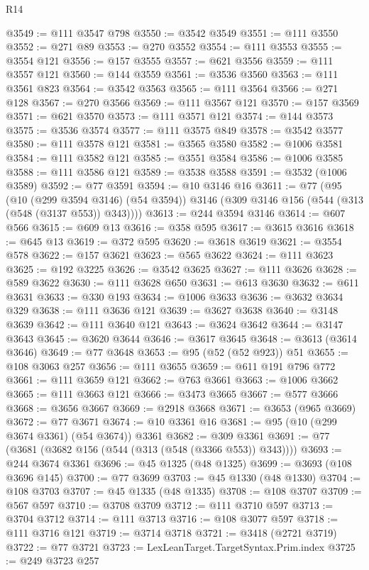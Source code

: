 \begin{lexlean}{R14}
\begin{coremodule}
@3549 := @111 @3547 @798
@3550 := @3542 @3549
@3551 := @111 @3550
@3552 := @271 @89
@3553 := @270 @3552
@3554 := @111 @3553
@3555 := @3554 @121
@3556 := @157 @3555
@3557 := @621 @3556
@3559 := @111 @3557 @121
@3560 := @144 @3559
@3561 := @3536 @3560
@3563 := @111 @3561 @823
@3564 := @3542 @3563
@3565 := @111 @3564
@3566 := @271 @128
@3567 := @270 @3566
@3569 := @111 @3567 @121
@3570 := @157 @3569
@3571 := @621 @3570
@3573 := @111 @3571 @121
@3574 := @144 @3573
@3575 := @3536 @3574
@3577 := @111 @3575 @849
@3578 := @3542 @3577
@3580 := @111 @3578 @121
@3581 := @3565 @3580
@3582 := @1006 @3581
@3584 := @111 @3582 @121
@3585 := @3551 @3584
@3586 := @1006 @3585
@3588 := @111 @3586 @121
@3589 := @3538 @3588
@3591 := @3532 (@1006 @3589)
@3592 := @77 @3591
@3594 := @10 @3146 @16
@3611 := @77
    (@95
      (@10 (@299 @3594 @3146) (@54 @3594))
      @3146
      (@309 @3146 @156 (@544 (@313 (@548 (@3137 @553)) @343))))
@3613 := @244 @3594 @3146
@3614 := @607 @566
@3615 := @609 @13
@3616 := @358 @595
@3617 := @3615 @3616
@3618 := @645 @13
@3619 := @372 @595
@3620 := @3618 @3619
@3621 := @3554 @578
@3622 := @157 @3621
@3623 := @565 @3622
@3624 := @111 @3623
@3625 := @192 @3225
@3626 := @3542 @3625
@3627 := @111 @3626
@3628 := @589 @3622
@3630 := @111 @3628 @650
@3631 := @613 @3630
@3632 := @611 @3631
@3633 := @330 @193
@3634 := @1006 @3633
@3636 := @3632 @3634 @329
@3638 := @111 @3636 @121
@3639 := @3627 @3638
@3640 := @3148 @3639
@3642 := @111 @3640 @121
@3643 := @3624 @3642
@3644 := @3147 @3643
@3645 := @3620 @3644
@3646 := @3617 @3645
@3648 := @3613 (@3614 @3646)
@3649 := @77 @3648
@3653 := @95 (@52 (@52 @923)) @51
@3655 := @108 @3063 @257
@3656 := @111 @3655
@3659 := @611 @191 @796 @772
@3661 := @111 @3659 @121
@3662 := @763 @3661
@3663 := @1006 @3662
@3665 := @111 @3663 @121
@3666 := @3473 @3665
@3667 := @577 @3666
@3668 := @3656 @3667
@3669 := @2918 @3668
@3671 := @3653 (@965 @3669)
@3672 := @77 @3671
@3674 := @10 @3361 @16
@3681 := @95 (@10 (@299 @3674 @3361) (@54 @3674)) @3361
@3682 := @309 @3361
@3691 := @77 (@3681 (@3682 @156 (@544 (@313 (@548 (@3366 @553)) @343))))
@3693 := @244 @3674 @3361
@3696 := @45 @1325 (@48 @1325)
@3699 := @3693 (@108 @3696 @145)
@3700 := @77 @3699
@3703 := @45 @1330 (@48 @1330)
@3704 := @108 @3703
@3707 := @45 @1335 (@48 @1335)
@3708 := @108 @3707
@3709 := @567 @597
@3710 := @3708 @3709
@3712 := @111 @3710 @597
@3713 := @3704 @3712
@3714 := @111 @3713
@3716 := @108 @3077 @597
@3718 := @111 @3716 @121
@3719 := @3714 @3718
@3721 := @3418 (@2721 @3719)
@3722 := @77 @3721
@3723 := LexLeanTarget.TargetSyntax.Prim.index
@3725 := @249 @3723 @257

\end{coremodule}
\end{lexlean}
